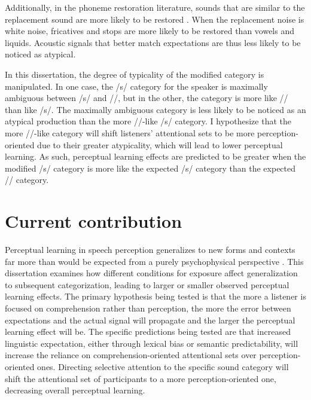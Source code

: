 Additionally, in the phoneme restoration literature, sounds that are similar to the replacement sound are more likely to be restored \citep{Samuel1981}.  
When the replacement noise is white noise, fricatives and stops are more likely to be restored than vowels and liquids.
Acoustic signals that better match expectations are thus less likely to be noticed as atypical.

In this dissertation, the degree of typicality of the modified category is manipulated.  
In one case, the /s/ category for the speaker is maximally ambiguous between /s/ and /\textesh/, but in the other, the category is more like /\textesh/ than like /s/.
The maximally ambiguous category is less likely to be noticed as an atypical production than the more /\textesh/-like /s/ category.
I hypothesize that the more /\textesh/-like category will shift listeners' attentional sets to be more perception-oriented due to their greater atypicality, which will lead to lower perceptual learning.
As such, perceptual learning effects are predicted to be greater when the modified /s/ category is more like the expected /s/ category than the expected /\textesh/ category.

\section{Current contribution}

Perceptual learning in speech perception generalizes to new forms and contexts far more than would be expected from a purely psychophysical perspective \citep{Norris2003,Gilbert2001}.
This dissertation examines how different conditions for exposure affect generalization to subsequent categorization, leading to larger or smaller observed perceptual learning effects.
The primary hypothesis being tested is that the more a listener is focused on comprehension rather than perception, the more the error between expectations and the actual signal will propagate and the larger the perceptual learning effect will be.
The specific predictions being tested are that increased linguistic expectation, either through lexical bias or semantic predictability, will increase the reliance on comprehension-oriented attentional sets over perception-oriented ones.  
Directing selective attention to the specific sound category will shift the attentional set of participants to a more perception-oriented one, decreasing overall perceptual learning. 


